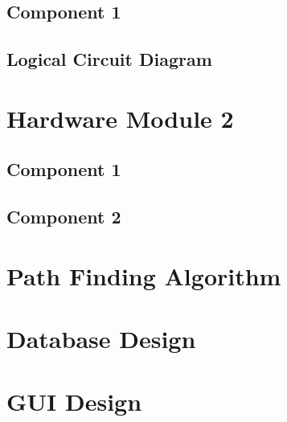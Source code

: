     \subsection{Component 1}
    \subsection{Logical Circuit Diagram}
\pagebreak
\section{Hardware Module 2}
    \subsection{Component 1}
    \subsection{Component 2}
\pagebreak
\section{Path Finding Algorithm}

\pagebreak
\section{Database Design}

\pagebreak
\section{GUI Design}

\pagebreak